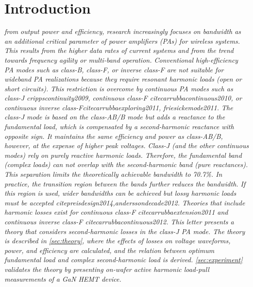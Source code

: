 \documentclass[journal]{IEEEtran}
\begin{document}
\section{Introduction}
\label{sec:introduction}
{\itshape {} from output power and efficiency, research increasingly
focuses on bandwidth as an additional critical parameter of power amplifiers
(PAs) for wireless systems. This results from the higher data rates of current
systems and from the trend towards frequency agility or multi-band operation.
%
Conventional high-efficiency PA modes such as class-B, class-F, or inverse
class-F are not suitable for wideband PA realizations because they require
resonant harmonic loads (open or short circuits). This restriction is overcome
by continuous PA modes such as class-J crippscontinuity2009,
continuous class-F
citecarrubbacontinuous2010,
or continuous inverse class-Fcitecarrubbaexploring2011, friesickemode2011.
%
The class-J mode is based on the class-AB/B mode but adds a reactance to the
fundamental load, which is compensated by a second-harmonic reactance with
opposite sign. It maintains the same efficiency and power as class-AB/B,
however, at the expense of higher peak voltages. Class-J (and the other
continuous modes) rely on purely reactive harmonic loads. Therefore, the
fundamental band (complex loads) can not overlap with the second-harmonic band
(pure reactances). This separation limits the theoretically achievable
bandwidth to 70.7\%. In practice, the transition region between the bands
further reduces the bandwidth. If this region is used, wider bandwidths can be
achieved but lossy harmonic loads must be accepted
cite{preisdesign2014,anderssondecade2012}.
%
Theories that include harmonic losses exist for continuous class-F
cite{carrubbaextension2011}
and continuous inverse class-F
cite{carrubbacontinuous2012}.
This letter presents a theory that considers second-harmonic losses in the
class-J PA mode. The theory is described in \cref{sec:theory}, where the
effects of losses on voltage waveforms, power, and efficiency are calculated,
and the relation between optimum fundamental load and complex second-harmonic
load is derived. \cref{sec:experiment} validates the theory by presenting
on-wafer active harmonic load-pull measurements of a GaN HEMT device.}
%
%
\end{document}
